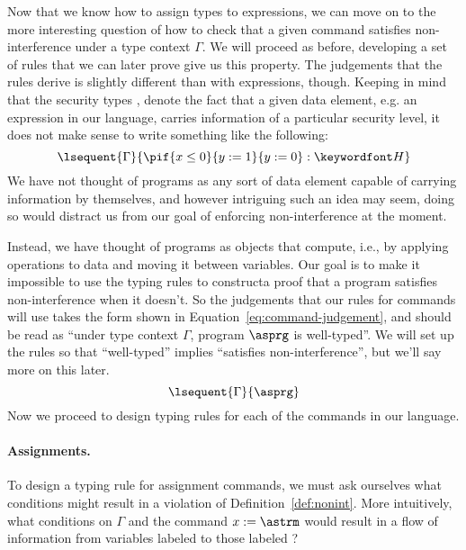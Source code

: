 \documentclass[11pt,twoside]{scrartcl}
\begin{document}
Now that we know how to assign types to expressions, we can move on to the more interesting question of how to check that a given command satisfies non-interference under a type context $\Gamma$. We will proceed as before, developing a set of rules that we can later prove give us this property. The judgements that the rules derive is slightly different than with expressions, though. Keeping in mind that the security types \lowsec, \hisec denote the fact that a given data element, e.g. an expression in our language, carries information of a particular security level, it does not make sense to write something like the following:
\[
\lsequent{\Gamma}{\pif{x \le 0}{y := 1}{y := 0} : \hisec}
\]
We have not thought of programs as any sort of data element capable of carrying information by themselves, and however intriguing such an idea may seem, doing so would distract us from our goal of enforcing non-interference at the moment.

Instead, we have thought of programs as objects that compute, i.e., by applying operations to data and moving it between variables. Our goal is to make it impossible to use the typing rules to constructa proof that a program satisfies non-interference when it doesn't. So the judgements that our rules for commands will use takes the form shown in Equation~\ref{eq:command-judgement}, and should be read as ``under type context $\Gamma$, program $\asprg$ is well-typed''. We will set up the rules so that ``well-typed'' implies ``satisfies non-interference'', but we'll say more on this later.
\begin{equation}
\label{eq:command-judgement}
\lsequent{\Gamma}{\asprg}
\end{equation}
Now we proceed to design typing rules for each of the commands in our language.

\paragraph{Assignments.} To design a typing rule for assignment commands, we must ask ourselves what conditions might result in a violation of Definition~\ref{def:nonint}. More intuitively, what conditions on $\Gamma$ and the command $x := \astrm$ would result in a flow of information from variables labeled \hisec to those labeled \lowsec?
\end{document}
